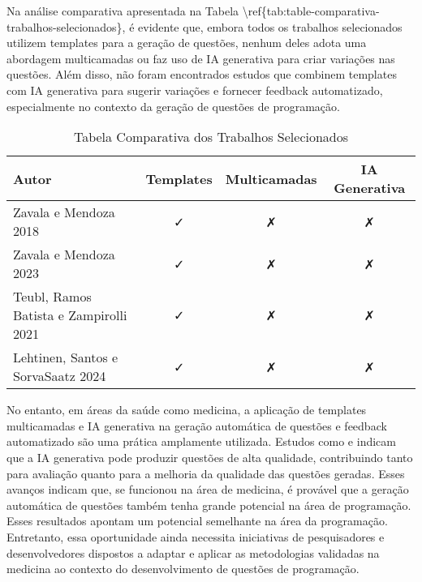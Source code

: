 Na análise comparativa apresentada na Tabela \textbackslash{}ref\{tab:table-comparativa-trabalhos-selecionados\}, é evidente  que, embora todos os trabalhos selecionados utilizem templates para a geração de questões, nenhum deles adota uma abordagem multicamadas ou faz uso de IA generativa para criar variações nas questões. Além disso, não foram encontrados estudos que combinem templates com IA generativa para sugerir variações e fornecer feedback automatizado, especialmente no contexto da geração de questões de programação. 

\begin{table}[htbp]
    \centering
    \begin{tabular}{|l|c|c|c|}
        \hline
        Autor& Templates & Multicamadas & IA Generativa \\ \hline
        Zavala e Mendoza 2018& \faCheck & \faClose& \faClose\\ \hline 
        Zavala e Mendoza 2023 & \faCheck&  \faClose& \faClose\\ \hline
        Teubl, Ramos Batista e Zampirolli 2021 & \faCheck& \faClose& \faClose\\\hline
 Lehtinen, Santos e SorvaSaatz 2024 & \faCheck & \faClose&\faClose \\\hline
    \end{tabular}
    \caption{Tabela Comparativa dos Trabalhos Selecionados}
    \label{tab:table-comparativa-trabalhos-selecionados}
\end{table}



No entanto, em áreas da saúde como medicina, a aplicação de templates multicamadas e IA generativa na geração automática de questões e feedback automatizado são uma prática amplamente utilizada. Estudos como \parencite{falcao2023} e \parencite{kiyak2024} indicam que a IA generativa pode produzir questões de alta qualidade, contribuindo tanto para avaliação quanto para a melhoria da qualidade das questões geradas. Esses avanços indicam que, se funcionou na área de medicina, é provável que a geração automática de questões também tenha grande potencial na área de programação. Esses resultados apontam um potencial semelhante na área da programação. Entretanto, essa oportunidade ainda necessita iniciativas de pesquisadores e desenvolvedores dispostos a adaptar e aplicar as metodologias validadas na medicina ao contexto do desenvolvimento de questões de programação. 

